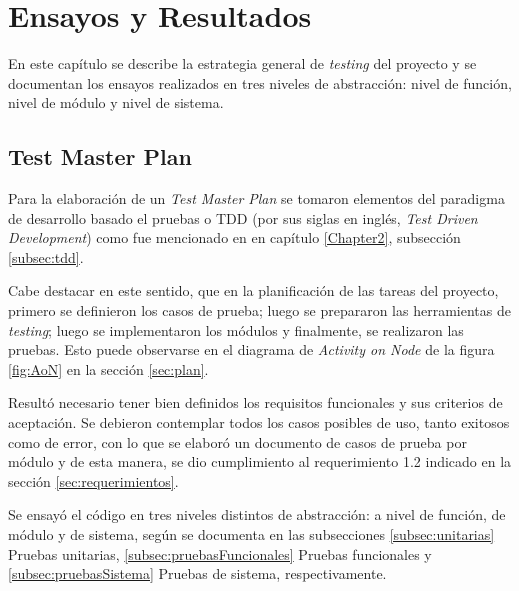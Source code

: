 
\chapter{Ensayos y Resultados} %

\label{Chapter4} %

En este capítulo se describe la estrategia general de \textit{testing} del proyecto y se documentan los ensayos realizados en tres niveles de abstracción: nivel de función, nivel de módulo y nivel de sistema.


\section{Test Master Plan}
\label{sec:masterPlan}

Para la elaboración de un \textit{Test Master Plan} se tomaron elementos del paradigma de desarrollo basado el pruebas o TDD (por sus siglas en inglés, \textit{Test Driven Development}) como fue mencionado en en capítulo \ref{Chapter2}, subsección \ref{subsec:tdd}. 

Cabe destacar en este sentido, que en la planificación de las tareas del proyecto, primero se definieron los casos de prueba; luego se prepararon las herramientas de \textit{testing}; luego se implementaron los módulos y finalmente, se realizaron las pruebas. Esto puede observarse en el diagrama de \textit{Activity on Node} de la figura \ref{fig:AoN} en la sección \ref{sec:plan}.

Resultó necesario tener bien definidos los requisitos funcionales y sus criterios de aceptación.  Se debieron contemplar todos los casos posibles de uso, tanto exitosos como de error, con lo que se elaboró un documento \citep{TestMasterPlan} de casos de prueba por módulo  y de esta manera, se dio cumplimiento al requerimiento 1.2 indicado en la sección \ref{sec:requerimientos}.  

Se ensayó el código en tres niveles distintos de abstracción: a nivel de función, de módulo y de sistema, según se documenta en las subsecciones \ref{subsec:unitarias} Pruebas unitarias, \ref{subsec:pruebasFuncionales} Pruebas funcionales y \ref{subsec:pruebasSistema} Pruebas de sistema, respectivamente. 

